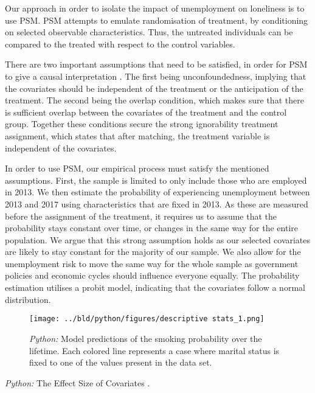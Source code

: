 \documentclass[11pt, a4paper, leqno]{article}
\begin{document}
Our approach in order to isolate the impact of unemployment on loneliness is to use PSM. PSM attempts to emulate randomisation of treatment, by conditioning on selected observable characteristics. Thus, the untreated individuals can be compared to the treated with respect to the control variables.

There are two important assumptions that need to be satisfied, in order for PSM to give a causal interpretation \citep{caliendo2008some}. The first being unconfoundedness, implying that the covariates should be independent of the treatment or the anticipation of the treatment. The second being the overlap condition, which makes sure that there is sufficient overlap between the covariates of the treatment and the control group. Together these conditions secure the strong ignorability treatment assignment, which states that after matching, the treatment variable is independent of the covariates.

In order to use PSM, our empirical process must satisfy the mentioned assumptions. First, the sample is limited to only include those who are employed in 2013. We then estimate the probability of experiencing unemployment between 2013 and 2017 using characteristics that are fixed in 2013. As these are measured before the assignment of the treatment, it requires us to assume that the probability stays constant over time, or changes in the same way for the entire population. We argue that this strong assumption holds as our selected covariates are likely to stay constant for the majority of our sample. We also allow for the unemployment risk to move the same way for the whole sample as government policies and economic cycles should influence everyone equally. The probability estimation utilises a probit model, indicating that the covariates follow a normal distribution.

\begin{figure}[H]

    \centering
    \texttt{[image: ../bld/python/figures/descriptive stats\_1.png]}

    \caption{\emph{Python:} Model predictions of the smoking probability over the
        lifetime. Each colored line represents a case where marital status is fixed to one
        of the values present in the data set.}
    \label{fig:python-predictions}

\end{figure}


\begin{table}[!h]
    
    \caption{\label{tab:python-summary}\emph{Python:} The Effect Size of
    Covariates .}
\end{table}







\printbibliography
{}



\end{document}
